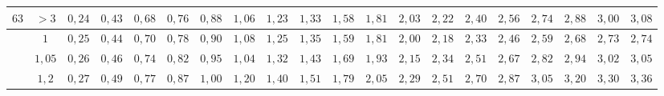 \begin{table}[]
{\begin{tabular}{|c|c|c|c|c|c|c|c|c|c|c|c|c|c|c|c|c|c|c|c|}
\multirow{-5}{*}{$63$}  & $>3$                                                                                & \cellcolor[HTML]{FFCCC9}$0,24$ & \cellcolor[HTML]{FFCCC9}$0,43$ & \cellcolor[HTML]{FFCCC9}$0,68$ & \cellcolor[HTML]{FFCCC9}$0,76$ & \cellcolor[HTML]{FFCCC9}$0,88$ & \cellcolor[HTML]{FFCCC9}$1,06$ & \cellcolor[HTML]{FFCCC9}$1,23$ & \cellcolor[HTML]{FD6864}$1,33$ & \cellcolor[HTML]{FD6864}$1,58$ & \cellcolor[HTML]{FD6864}$1,81$ & \cellcolor[HTML]{FD6864}$2,03$ & \cellcolor[HTML]{FE0000}$2,22$ & \cellcolor[HTML]{FE0000}$2,40$                        & \cellcolor[HTML]{FE0000}$2,56$ & \cellcolor[HTML]{FE0000}$2,74$ & \cellcolor[HTML]{CB0000}$2,88$ & \cellcolor[HTML]{CB0000}$3,00$ & \cellcolor[HTML]{CB0000}$3,08$ \\ \hline
                        & $1$                                                                                 & \cellcolor[HTML]{FFCCC9}$0,25$ & \cellcolor[HTML]{FFCCC9}$0,44$ & \cellcolor[HTML]{FFCCC9}$0,70$ & \cellcolor[HTML]{FFCCC9}$0,78$ & \cellcolor[HTML]{FFCCC9}$0,90$ & \cellcolor[HTML]{FFCCC9}$1,08$ & \cellcolor[HTML]{FD6864}$1,25$ & \cellcolor[HTML]{FD6864}$1,35$ & \cellcolor[HTML]{FD6864}$1,59$ & \cellcolor[HTML]{FD6864}$1,81$ & \cellcolor[HTML]{FE0000}$2,00$ & \cellcolor[HTML]{FE0000}$2,18$ & \cellcolor[HTML]{FE0000}$2,33$                        & \cellcolor[HTML]{FE0000}$2,46$ & \cellcolor[HTML]{CB0000}$2,59$ & \cellcolor[HTML]{CB0000}$2,68$ & \cellcolor[HTML]{9A0000}$2,73$ & \cellcolor[HTML]{9A0000}$2,74$ \\ \cline{2-20} 
                        & $1,05$                                                                              & \cellcolor[HTML]{FFCCC9}$0,26$ & \cellcolor[HTML]{FFCCC9}$0,46$ & \cellcolor[HTML]{FFCCC9}$0,74$ & \cellcolor[HTML]{FFCCC9}$0,82$ & \cellcolor[HTML]{FFCCC9}$0,95$ & \cellcolor[HTML]{FFCCC9}$1,04$ & \cellcolor[HTML]{FD6864}$1,32$ & \cellcolor[HTML]{FD6864}$1,43$ & \cellcolor[HTML]{FD6864}$1,69$ & \cellcolor[HTML]{FD6864}$1,93$ & \cellcolor[HTML]{FE0000}$2,15$ & \cellcolor[HTML]{FE0000}$2,34$ & \cellcolor[HTML]{FE0000}$2,51$                        & \cellcolor[HTML]{FE0000}$2,67$ & \cellcolor[HTML]{CB0000}$2,82$ & \cellcolor[HTML]{CB0000}$2,94$ & \cellcolor[HTML]{9A0000}$3,02$ & \cellcolor[HTML]{9A0000}$3,05$ \\ \cline{2-20} 
                        & $1,2$                                                                               & \cellcolor[HTML]{FFCCC9}$0,27$ & \cellcolor[HTML]{FFCCC9}$0,49$ & \cellcolor[HTML]{FFCCC9}$0,77$ & \cellcolor[HTML]{FFCCC9}$0,87$ & \cellcolor[HTML]{FFCCC9}$1,00$ & \cellcolor[HTML]{FFCCC9}$1,20$ & \cellcolor[HTML]{FD6864}$1,40$ & \cellcolor[HTML]{FD6864}$1,51$ & \cellcolor[HTML]{FD6864}$1,79$ & \cellcolor[HTML]{FD6864}$2,05$ & \cellcolor[HTML]{FE0000}$2,29$ & \cellcolor[HTML]{FE0000}$2,51$ & \cellcolor[HTML]{FE0000}$2,70$                        & \cellcolor[HTML]{FE0000}$2,87$ & \cellcolor[HTML]{CB0000}$3,05$ & \cellcolor[HTML]{CB0000}$3,20$ & \cellcolor[HTML]{9A0000}$3,30$ & \cellcolor[HTML]{9A0000}$3,36$ \\ \cline{2-20} 

\end{tabular}}
\end{table}
